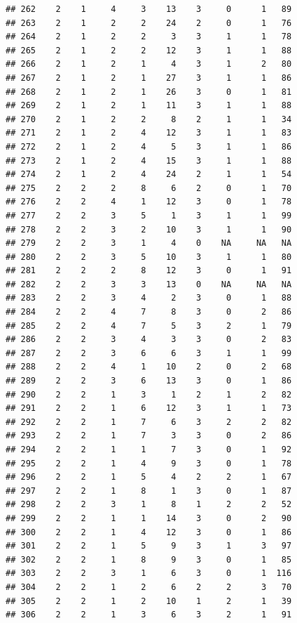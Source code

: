 \documentclass[krantz2]{krantz}\usepackage{knitr}%
\begin{document}
\begin{knitrout}
\begin{kframe}
\begin{verbatim}
## 262    2    1     4     3    13    3     0      1   89
## 263    2    1     2     2    24    2     0      1   76
## 264    2    1     2     2     3    3     1      1   78
## 265    2    1     2     2    12    3     1      1   88
## 266    2    1     2     1     4    3     1      2   80
## 267    2    1     2     1    27    3     1      1   86
## 268    2    1     2     1    26    3     0      1   81
## 269    2    1     2     1    11    3     1      1   88
## 270    2    1     2     2     8    2     1      1   34
## 271    2    1     2     4    12    3     1      1   83
## 272    2    1     2     4     5    3     1      1   86
## 273    2    1     2     4    15    3     1      1   88
## 274    2    1     2     4    24    2     1      1   54
## 275    2    2     2     8     6    2     0      1   70
## 276    2    2     4     1    12    3     0      1   78
## 277    2    2     3     5     1    3     1      1   99
## 278    2    2     3     2    10    3     1      1   90
## 279    2    2     3     1     4    0    NA     NA   NA
## 280    2    2     3     5    10    3     1      1   80
## 281    2    2     2     8    12    3     0      1   91
## 282    2    2     3     3    13    0    NA     NA   NA
## 283    2    2     3     4     2    3     0      1   88
## 284    2    2     4     7     8    3     0      2   86
## 285    2    2     4     7     5    3     2      1   79
## 286    2    2     3     4     3    3     0      2   83
## 287    2    2     3     6     6    3     1      1   99
## 288    2    2     4     1    10    2     0      2   68
## 289    2    2     3     6    13    3     0      1   86
## 290    2    2     1     3     1    2     1      2   82
## 291    2    2     1     6    12    3     1      1   73
## 292    2    2     1     7     6    3     2      2   82
## 293    2    2     1     7     3    3     0      2   86
## 294    2    2     1     1     7    3     0      1   92
## 295    2    2     1     4     9    3     0      1   78
## 296    2    2     1     5     4    2     2      1   67
## 297    2    2     1     8     1    3     0      1   87
## 298    2    2     3     1     8    1     2      2   52
## 299    2    2     1     1    14    3     0      2   90
## 300    2    2     1     4    12    3     0      1   86
## 301    2    2     1     5     9    3     1      3   97
## 302    2    2     1     8     9    3     0      1   85
## 303    2    2     3     1     6    3     0      1  116
## 304    2    2     1     2     6    2     2      3   70
## 305    2    2     1     2    10    1     2      1   39
## 306    2    2     1     3     6    3     2      1   91

\end{verbatim}
\end{kframe}
\end{knitrout}
\end{document}

